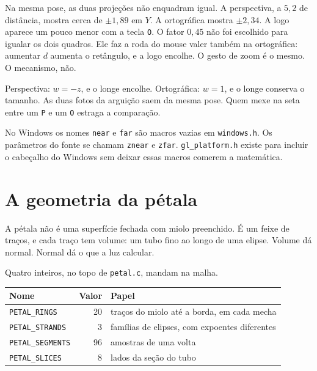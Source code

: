 \documentclass[11pt,a4paper]{article}
\newcommand{\fn}[1]{\texttt{\nobreak\hspace{0pt}#1}}
\begin{document}
Na mesma pose, as duas projeções não enquadram igual. A perspectiva, a \(5{,}2\) de distância, mostra cerca de \(\pm 1{,}89\) em \(Y\). A ortográfica mostra \(\pm 2{,}34\). A logo aparece um pouco menor com a tecla \fn{O}. O fator \(0{,}45\) não foi escolhido para igualar os dois quadros. Ele faz a roda do mouse valer também na ortográfica: aumentar \(d\) aumenta o retângulo, e a logo encolhe. O gesto de zoom é o mesmo. O mecanismo, não.

\begin{voz}
Perspectiva: \(w = -z\), e o longe encolhe. Ortográfica: \(w = 1\), e o longe conserva o tamanho. As duas fotos da arguição saem da mesma pose. Quem mexe na seta entre um \fn{P} e um \fn{O} estraga a comparação.
\end{voz}

No Windows os nomes \fn{near} e \fn{far} são macros vazias em \fn{windows.h}. Os parâmetros do fonte se chamam \fn{znear} e \fn{zfar}. \fn{gl\_platform.h} existe para incluir o cabeçalho do Windows sem deixar essas macros comerem a matemática.

\section{A geometria da pétala}
\label{sec:geo}

A pétala não é uma superfície fechada com miolo preenchido. É um feixe de traços, e cada traço tem volume: um tubo fino ao longo de uma elipse. Volume dá normal. Normal dá o que a luz calcular.

Quatro inteiros, no topo de \fn{petal.c}, mandam na malha.

\begin{center}
\small
\begin{tabular}{@{}l r p{8.6cm}@{}}
\toprule
Nome & Valor & Papel \\
\midrule
\fn{PETAL\_RINGS} & 20 & traços do miolo até a borda, em cada mecha \\
\fn{PETAL\_STRANDS} & 3 & famílias de elipses, com expoentes diferentes \\
\fn{PETAL\_SEGMENTS} & 96 & amostras de uma volta \\
\fn{PETAL\_SLICES} & 8 & lados da seção do tubo \\
\bottomrule
\end{tabular}
\end{center}
\end{document}
